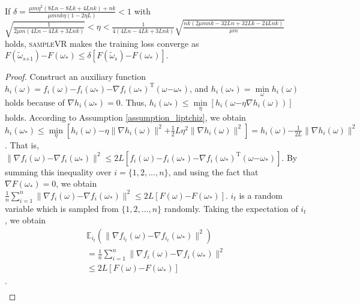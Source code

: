 \documentclass[letterpaper]{article}
\begin{document}
\begin{Theorem}
\label{Theorem_converge}
If $\delta=\frac{\mu m \eta^2 (8Ln-8Lk+4Lnk)+nk}{  \mu m nk \eta (1-2\eta L)  } < 1$ with $\sqrt{\frac{1}{2\mu m (4Ln-4Lk+3Lnk)}} < \eta < \frac{1}{4(4Ln-4Lk+3Lnk)}\sqrt{\frac{nk(2\mu mnk - 32Ln+ 32 Lk -24 Lnk)}{\mu m}}$ holds, \textsc{sampleVR} makes the training loss converge as
$F(\tilde{\omega}_{s\mathrm{+}1}) \mathrm{-} F(\omega_\ast)  \le \delta [F(\tilde{\omega}_s)\mathrm{-}F(\omega_\ast)]$.
\end{Theorem}
\begin{proof}
Construct an auxiliary function $h_i(\omega)=f_i(\omega)\mathrm{-}f_i(\omega_\ast)\mathrm{-}\nabla f_i(\omega_\ast)^\mathrm{T}(\omega\mathrm{-}\omega_\ast)$, and $h_i(\omega_\ast)=\min\limits_\omega h_i(\omega)$ holds because of $\nabla h_i(\omega_\ast)=0$. Thus, $h_i(\omega_\ast)\le \min\limits_\eta [h_i(\omega\mathrm{-}\eta \nabla h_i(\omega))]$ holds. According to Assumption \ref{assumption_liptchiz}, we obtain
$h_i(\omega_\ast)\le\min\limits_\eta [h_i(\omega)\mathrm{-}\eta \parallel \nabla h_i(\omega) \parallel^2\mathrm{+}\frac{1}{2} L \eta^2 \parallel  \nabla h_i(\omega)  \parallel^2  ] 
=h_i(\omega)\mathrm{-}\frac{1}{2L}\parallel  \nabla h_i(\omega) \parallel^2$.  That is, 
$\parallel   \nabla f_i(\omega)  \mathrm{-} \nabla f_i(\omega_\ast)   \parallel^2 \le 2L [ f_i(\omega)  \mathrm{-}  f_i(\omega_\ast)  \mathrm{-}\nabla f_i(\omega_\ast)^{\mathrm{T}}(\omega\mathrm{-}\omega_\ast)  ]$. By summing this inequality over $i=\{1,2, ..., n\}$, and using the fact that $\nabla F(\omega_\ast)=0$, we obtain $
\frac{1}{n} \sum\limits_{i=1}^n \parallel  \nabla f_i(\omega)  \mathrm{-} \nabla f_i(\omega_\ast)  \parallel^2  \mathrm{\le}   2L [F(\omega)\mathrm{-}F(\omega_\ast)] $. $i_t$ is a random variable which is sampled from $\{1,2, ...,n\}$ randomly. Taking the expectation of $i_t$, we obtain 
\begin{equation}\label{equa_1}
\begin{array}{ll}
\mathbb{E}_{i_t}(\parallel  \nabla f_{i_{t}}(\omega) \mathrm{-} \nabla f_{i_{t}}(\omega_{\ast}) \parallel^2) \\
= \frac{1}{n} \sum\limits_{i=1}^n \parallel  \nabla f_i(\omega)  \mathrm{-} \nabla f_i(\omega_\ast)  \parallel^2 \\
\le 2L [F(\omega)\mathrm{-}F(\omega_\ast)] 
\end{array} 
\end{equation}.  
\begin{equation}\label{equa_2}
\begin{array}{ll}

\end{array}
\end{equation}
\end{proof}
\end{document}
